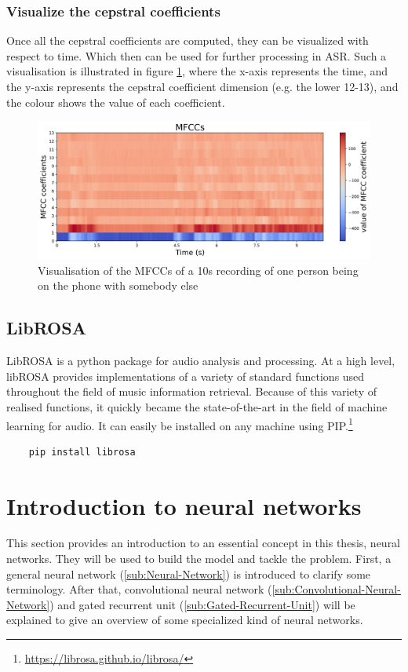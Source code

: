 \subsubsection{Visualize the cepstral coefficients}
Once all the cepstral coefficients are computed, they can be visualized with respect to time. Which then can be used for further processing in \gls{ASR}. Such a visualisation is illustrated in figure \ref{fig:MFCC-Visualisation}, where the x-axis represents the time, and the y-axis represents the cepstral coefficient dimension (e.g. the lower 12-13), and the colour shows the value of each coefficient.
\begin{figure}[htbp]
	\centering
	\includegraphics[scale=0.5]{img/mfccs.png}
	\caption{Visualisation of the MFCCs of a 10s recording of one person being on the phone with somebody else}
	\label{fig:MFCC-Visualisation}
\end{figure}

\subsection{LibROSA}
\label{sub:Librosa}
LibROSA is a python package for audio analysis and processing. At a high level, libROSA provides implementations of a variety of standard functions used throughout the ﬁeld of music information retrieval. Because of this variety of realised functions, it quickly became the state-of-the-art in the field of machine learning for audio. It can easily be installed on any machine using PIP.\footnote{\url{https://librosa.github.io/librosa/}}

\begin{verbatim}
    pip install librosa
\end{verbatim}

\section{Introduction to neural networks}
\label{sec:Intro-NN}
This section provides an introduction to an essential concept in this thesis, neural networks. They will be used to build the model and tackle the problem. First, a general neural network (\ref{sub:Neural-Network}) is introduced to clarify some terminology. After that, convolutional neural network (\ref{sub:Convolutional-Neural-Network}) and gated recurrent unit (\ref{sub:Gated-Recurrent-Unit}) will be explained to give an overview of some specialized kind of neural networks.

